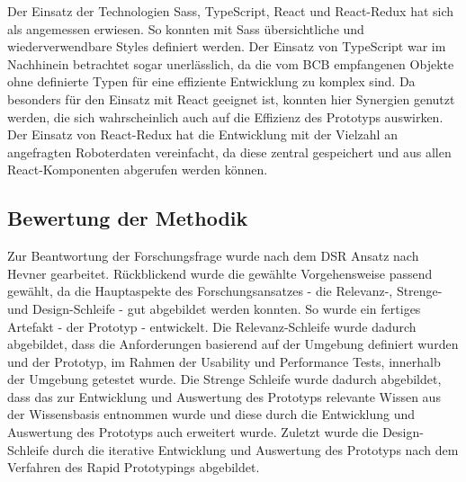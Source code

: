 Der Einsatz der Technologien \ac{Sass}, TypeScript, React und React-Redux hat sich als angemessen erwiesen. So konnten mit \ac{Sass} übersichtliche und wiederverwendbare Styles definiert werden. Der Einsatz von TypeScript war im Nachhinein betrachtet sogar unerlässlich, da die vom \ac{BCB} empfangenen Objekte ohne definierte Typen für eine effiziente Entwicklung zu komplex sind. Da \deckgl{} besonders für den Einsatz mit React geeignet ist, konnten hier Synergien genutzt werden, die sich wahrscheinlich auch auf die Effizienz des Prototyps auswirken. Der Einsatz von React-Redux hat die Entwicklung mit der Vielzahl an angefragten Roboterdaten vereinfacht, da diese zentral gespeichert und aus allen React-Komponenten abgerufen werden können.

\subsection{Bewertung der Methodik}
Zur Beantwortung der Forschungsfrage wurde nach dem \ac{DSR} Ansatz nach Hevner \cite{Hevner2004} gearbeitet. Rückblickend wurde die gewählte Vorgehensweise passend gewählt, da die Hauptaspekte des Forschungsansatzes - die Relevanz-, Strenge- und Design-Schleife - gut abgebildet werden konnten. So wurde ein fertiges Artefakt - der Prototyp - entwickelt. Die Relevanz-Schleife wurde dadurch abgebildet, dass die Anforderungen basierend auf der Umgebung definiert wurden und der Prototyp, im Rahmen der Usability und Performance Tests, innerhalb der Umgebung getestet wurde. Die Strenge Schleife wurde dadurch abgebildet, dass das zur Entwicklung und Auswertung des Prototyps relevante Wissen aus der Wissensbasis entnommen wurde und diese durch die Entwicklung und Auswertung des Prototyps auch erweitert wurde. Zuletzt wurde die Design-Schleife durch die iterative Entwicklung und Auswertung des Prototyps nach dem Verfahren des Rapid Prototypings abgebildet.
